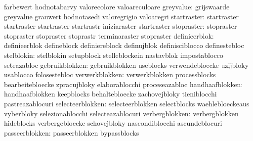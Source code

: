                                   farbewert                        hodnotabarvy
                                  valorecolore                     valoareculoare
                      greyvalue:  grijswaarde                      greyvalue
                                  grauwert                         hodnotasedi
                                  valoregrigio                     valoaregri
                    startraster:  startraster                      startraster
                                  startraster                      startrastr
                                  iniziaraster                     startraster %
                     stopraster:  stopraster                       stopraster
                                  stopraster                       stoprastr
                                  terminaraster                    stopraster
                  definieerblok:  definieerblok                    defineblock
                                  definiereblock                   definujblok
                                  definisciblocco                  definestebloc
                     stelblokin:  stelblokin                       setupblock
                                  stelleblockein                   nastavblok
                                  impostablocco                    seteazabloc
                 gebruikblokken:  gebruikblokken                   useblocks
                                  verwendebloecke                  uzijbloky
                                  usablocco                        folosestebloc
                 verwerkblokken:  verwerkblokken                   processblocks
                                  bearbeitebloecke                 zpracujbloky
                                  elaborablocchi                   proceseazabloc
                handhaafblokken:  handhaafblokken                  keepblocks
                                  behaltebloecke                   zachovejbloky
                                  tieniblocchi                     pastreazablocuri
               selecteerblokken:  selecteerblokken                 selectblocks
                                  waehlebloeckeaus                 vyberbloky
                                  selezionablocchi                 selecteazablocuri
                 verbergblokken:  verbergblokken                   hideblocks
                                  verbergebloecke                  schovejbloky
                                  nascondiblocchi                  ascundeblocuri
                 passeerblokken:  passeerblokken                   bypassblocks
